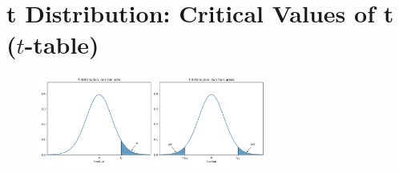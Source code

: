 \section{t Distribution: Critical Values of t ($t$-table)}

\changefontsizes{6pt}




\begin{figure}[H]
    \centering
    \includegraphics[width=\linewidth, height=3cm, keepaspectratio]{Pictures/distributions/img_t_scores_tails.jpg}
\end{figure}



